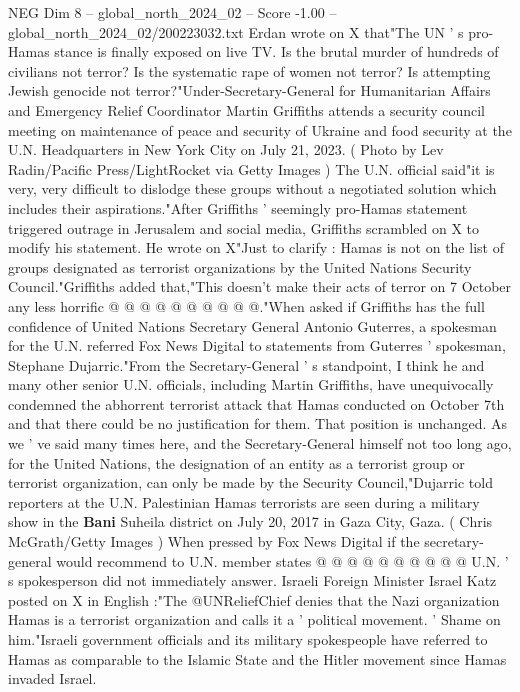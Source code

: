 \begin{textsample}{NEG Dim 8 – global\_north\_2024\_02 – Score -1.00 – global\_north\_2024\_02/200223032.txt}  \label{ex:f8_neg_432}
Erdan wrote on X that"The UN ' s pro-Hamas stance is finally exposed on live TV.
Is the brutal murder of hundreds of civilians not terror?
Is the systematic rape of women not terror?
Is attempting Jewish genocide not terror?"Under-Secretary-General for Humanitarian Affairs and Emergency Relief Coordinator Martin Griffiths attends a security council meeting on maintenance of peace and security of Ukraine and food security at the U.N.
Headquarters in New York City on July 21, 2023. ( Photo by Lev Radin/Pacific Press/LightRocket via Getty Images ) The U.N. official said"it is very, very difficult to dislodge these groups without a negotiated solution which includes their aspirations."After Griffiths ' seemingly pro-Hamas statement triggered outrage in Jerusalem and social media, Griffiths scrambled on X to modify his statement.
He wrote on X"Just to clarify : Hamas is not on the list of groups designated as terrorist organizations by the United Nations Security Council."Griffiths added that,"This doesn't make their acts of terror on 7 October any less horrific @ @ @ @ @ @ @ @ @ @."When asked if Griffiths has the full confidence of United Nations Secretary General Antonio Guterres, a spokesman for the U.N. referred Fox News Digital to statements from Guterres ' spokesman, Stephane Dujarric."From the Secretary-General ' s standpoint, I think he and many other senior U.N. officials, including Martin Griffiths, have unequivocally condemned the abhorrent terrorist attack that Hamas conducted on October 7th and that there could be no justification for them.
That position is unchanged.
As we ' ve said many times here, and the Secretary-General himself not too long ago, for the United Nations, the designation of an entity as a terrorist group or terrorist organization, can only be made by the Security Council,"Dujarric told reporters at the U.N.
Palestinian Hamas terrorists are seen during a military show in the \textbf{Bani} Suheila district on July 20, 2017 in Gaza City, Gaza. ( Chris McGrath/Getty Images ) When pressed by Fox News Digital if the secretary-general would recommend to U.N. member states @ @ @ @ @ @ @ @ @ @ U.N. ' s spokesperson did not immediately answer.
Israeli Foreign Minister Israel Katz posted on X in English :"The @UNReliefChief denies that the Nazi organization Hamas is a terrorist organization and calls it a ' political movement. ' Shame on him."Israeli government officials and its military spokespeople have referred to Hamas as comparable to the Islamic State and the Hitler movement since Hamas invaded Israel.

\end{textsample}

